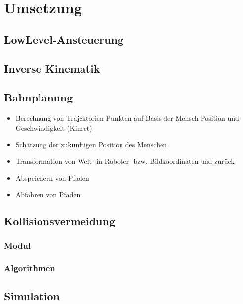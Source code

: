 \section{Umsetzung}


\subsection{LowLevel-Ansteuerung}


\subsection{Inverse Kinematik}


\subsection{Bahnplanung}

\begin{itemize}
	\item  Berechnung von Trajektorien-Punkten auf Basis der Mensch-Position und Geschwindigkeit (Kinect)
	\item Schätzung der zukünftigen Position des Menschen
	\item Transformation von Welt- in Roboter- bzw. Bildkoordinaten und zurück
	\item Abspeichern von Pfaden
	\item Abfahren von Pfaden
\end{itemize}


\subsection{Kollisionsvermeidung}

\subsubsection{Modul}

\subsubsection{Algorithmen}


\subsection{Simulation}
